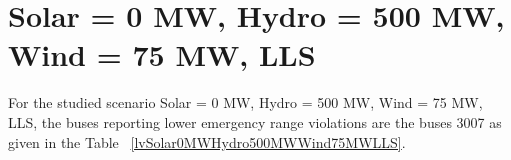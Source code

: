\documentclass[10pt]{report}
\begin{document}
\section{Solar = 0 MW, Hydro = 500 MW, Wind = 75 MW, LLS}
For the studied scenario Solar = 0 MW, Hydro = 500 MW, Wind = 75 MW, LLS, the buses reporting lower emergency range violations are the buses 3007 as given in the Table ~\ref{lvSolar0MWHydro500MWWind75MWLLS}.
\begin{table}[H]
\caption{Contingencies reporting bus voltages lower than emergency voltage of 1.1 PU for scenario Solar = 0 MW, Hydro = 500 MW, Wind = 75 MW, LLS}
\label{lvSolar0MWHydro500MWWind75MWLLS}
\centering
{}
\end{table}
\end{document}
